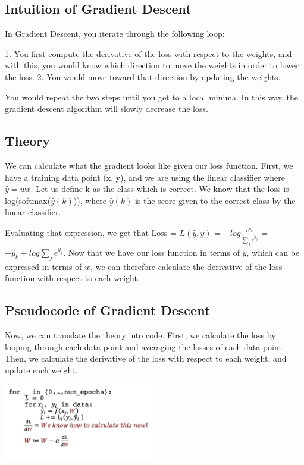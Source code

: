 \documentclass{article}
\begin{document}
\subsection{Intuition of Gradient Descent}

In Gradient Descent, you iterate through the following loop:

1. You first compute the derivative of the loss with respect to the weights, and with this, you would know which direction to move the weights in order to lower the loss.
2. You would move toward that direction by updating the weights.

You would repeat the two steps until you get to a local minima. In this way, the gradient descent algorithm will slowly decrease the loss.

\subsection{Theory}

We can calculate what the gradient looks like given our loss function. First, we have a training data point (x, y), and we are using the linear classifier where $\hat{y} = wx$. Let us define k as the class which is correct. We know that the loss is -log(softmax($\hat{y}(k)$)), where $\hat{y}(k)$ is the score given to the correct class by the linear classifier.

Evaluating that expression, we get that Loss = $L(\hat{y}, y)$ = $-log\frac{e^{\hat{y}_k}}{\sum_{j}e^{\hat{y}_j}}$ = $-\hat{y}_k + log\sum_j e^{\hat{y}_j}$. Now that we have our loss function in terms of $\hat{y}$, which can be expressed in terms of $w$, we can therefore calculate the derivative of the loss function with respect to each weight.

\subsection{Pseudocode of Gradient Descent}

Now, we can translate the theory into code. First, we calculate the loss by looping through each data point and averaging the losses of each data point. Then, we calculate the derivative of the loss with respect to each weight, and update each weight.

\includegraphics[width=250px]{cs131_pic_2.png}
\end{document}
